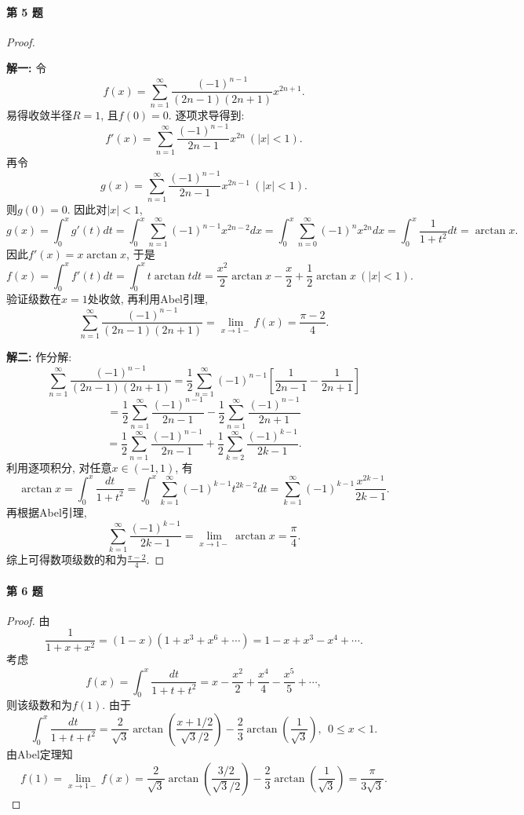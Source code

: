 \documentclass[UTF8,11pt, a4paper, oneside, fontset=none]{ctexbook}
\begin{document}
\paragraph{第 5 题}
\begin{proof}
\

\noindent
{\bf 解一:} 令
\[
f(x) = \sum_{n=1}^{\infty} \frac{(-1)^{n-1}}{(2n-1)(2n+1)} x^{2n+1}.
\]
易得收敛半径$R =1$, 且$f(0) = 0$. 逐项求导得到:
\[
f'(x) = \sum_{n=1}^{\infty} \frac{(-1)^{n-1}}{2n-1} x^{2n} \ (|x| < 1).
\]
再令
\[
g(x) =  \sum_{n=1}^{\infty} \frac{(-1)^{n-1}}{2n-1} x^{2n-1} \ (|x| < 1).
\]
则$g(0) = 0$. 因此对$|x| < 1$,
\[
g(x) = \int_0^x g'(t) dt =  \int_0^x \sum_{n=1}^{\infty} (-1)^{n-1} x^{2n-2} dx = \int_0^x \sum_{n=0}^{\infty} (-1)^{n} x^{2n} dx = \int_0^x \frac{1}{1+t^2} dt = \arctan x.
\]
因此$f'(x) = x \arctan x$, 于是
\[
f(x) = \int_0^x f'(t) dt = \int_0^x t \arctan t dt = \frac{x^2}{2} \arctan x - \frac{x}{2} + \frac{1}{2} \arctan x \ (|x| < 1).
\]
验证级数在$x=1$处收敛, 再利用Abel引理,
\[
\sum_{n=1}^{\infty} \frac{(-1)^{n-1}}{(2n-1)(2n+1)} = \lim_{x \to 1-} f(x) = \frac{\pi -2}{4}.
\]


\noindent
{\bf 解二:} 作分解:
\[
\sum_{n=1}^{\infty} \frac{(-1)^{n-1}}{(2n-1)(2n+1)} = \frac{1}{2} \sum_{n=1}^{\infty} (-1)^{n-1} \left[ \frac{1}{2n-1} - \frac{1}{2n+1} \right]
\]
\[
= \frac{1}{2} \sum_{n=1}^{\infty} \frac{(-1)^{n-1}}{2n-1} - \frac{1}{2} \sum_{n=1}^{\infty} \frac{(-1)^{n-1}}{2n+1}
\]
\[
= \frac{1}{2} \sum_{n=1}^{\infty} \frac{(-1)^{n-1}}{2n-1} + \frac{1}{2} \sum_{k=2}^{\infty} \frac{(-1)^{k-1}}{2k-1}.
\]
利用逐项积分, 对任意$x \in (-1, 1)$, 有
\[
\arctan x = \int_0^x \frac{dt}{1+t^2} = \int_0^x \sum_{k=1}^{\infty} (-1)^{k-1} t^{2k-2} dt = \sum_{k=1}^{\infty} (-1)^{k-1} \frac{x^{2k-1}}{2k-1}.
\] 
再根据Abel引理,
\[
\sum_{k=1}^{\infty} \frac{(-1)^{k-1}}{2k-1} = \lim_{x \to 1-} \arctan x = \frac{\pi}{4}.
\]
综上可得数项级数的和为$ \frac{\pi -2}{4}$.

\end{proof}

\paragraph{第 6 题}
\begin{proof}

由
\[
\frac{1}{1 + x + x^2} = (1-x)(1 + x^3 + x^6 + \cdots ) =  1 -x + x^3 - x^4 + \cdots.
\]
考虑
\[
f(x) = \int_0^x \frac{dt}{1 + t + t^2} = x - \frac{x^2}{2} + \frac{x^4}{4} - \frac{x^5}{5} + \cdots, 
\]
则该级数和为$f(1)$. 由于
\[
\int_0^x \frac{dt}{1 + t + t^2} = \frac{2}{\sqrt 3} \arctan \left( \frac{x + 1/2}{\sqrt 3 /2} \right) - \frac{2}{3} \arctan \left( \frac{1}{\sqrt 3} \right), \ \ 0 \leq x < 1.
\]
由Abel定理知
\[
f(1) = \lim_{x \to 1-} f(x) = \frac{2}{\sqrt 3} \arctan \left( \frac{3/2}{\sqrt 3 /2} \right) - \frac{2}{3} \arctan \left( \frac{1}{\sqrt 3} \right) = \frac{\pi}{3 \sqrt 3}.
\]
\end{proof}
\end{document}
